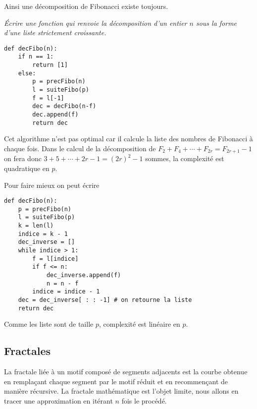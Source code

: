 Ainsi une décomposition de Fibonacci existe toujours.
\begin{Exercise}[title = {Calcul de la décomposition}]\it 
Écrire une fonction  qui renvoie la décomposition d'un entier $n$ sous la forme d'une liste strictement croissante.
\end{Exercise}
\begin{Answer}
\begin{lstlisting}
def decFibo(n):
    if n == 1:
        return [1]
    else:
        p = precFibo(n)
        l = suiteFibo(p)
        f = l[-1]
        dec = decFibo(n-f)
        dec.append(f)
        return dec
\end{lstlisting}
Cet algorithme n'est pas optimal car il calcule la liste des nombres de Fibonacci à chaque fois. Dans le calcul de la décomposition de $F_2+F_4+\cdots+F_{2r} = F_{2r+1} - 1$ on fera donc $3 + 5 + \cdots +{2r-1}=(2r)^2-1$ sommes, la complexité est quadratique en $p$.

Pour faire mieux on peut écrire
\begin{lstlisting}
def decFibo(n):
    p = precFibo(n)
    l = suiteFibo(p)
    k = len(l)
    indice = k - 1
    dec_inverse = []
    while indice > 1:
        f = l[indice]
        if f <= n:
            dec_inverse.append(f)
            n = n - f
        indice = indice - 1
    dec = dec_inverse[ : : -1] # on retourne la liste
    return dec
\end{lstlisting}
Comme les liste sont de taille $p$, complexité est linéaire en $p$.
\end{Answer}
\subsection{Fractales}
La fractale liée à un motif composé de segments adjacents est la courbe obtenue en remplaçant chaque segment par le motif réduit et en recommençant de manière récursive. La fractale mathématique est l'objet limite, nous allons en tracer une approximation en itérant $n$ fois le procédé.

